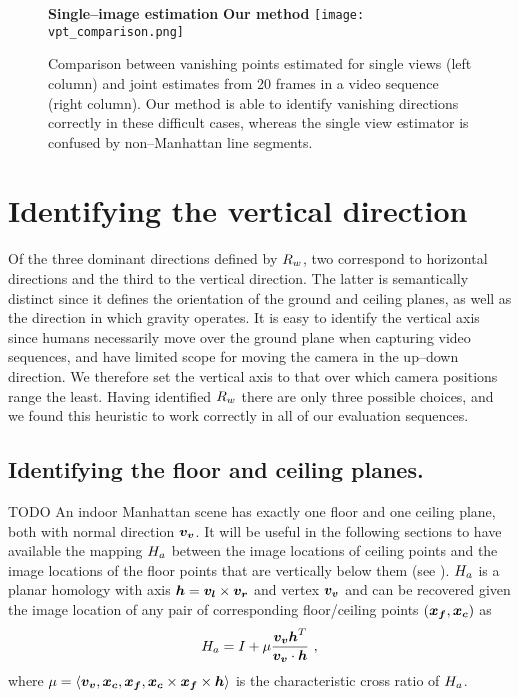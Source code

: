\begin{figure}[tb]
  \centering
      {\bf Single--image estimation}\cite{Zhang02} \hspace{2.25cm}
      {\bf Our method}
  \texttt{[image: vpt\_comparison.png]}
  \caption{Comparison between vanishing points estimated for single
    views (left column) and joint estimates from 20 frames in a video
    sequence (right column). Our method is able to identify vanishing
    directions correctly in these difficult cases, whereas the single
    view estimator is confused by non--Manhattan line segments.}
  \label{fig:vpt-comparison}
\end{figure}

\section{Identifying the vertical direction}
Of the three dominant directions defined by $\SceneR$, two correspond to
horizontal directions and the third to the vertical direction. The
latter is semantically distinct since it defines the orientation of
the ground and ceiling planes, as well as the direction in which
gravity operates. It is easy to identify the vertical axis since
humans necessarily move over the ground plane when capturing video
sequences, and have limited scope for moving the camera in the
up--down direction. We therefore set the vertical axis to that over
which camera positions range the least. Having identified $\SceneR$ there
are only three possible choices, and we found this heuristic to work
correctly in all of our evaluation sequences.


\subsection{Identifying the floor and ceiling planes.}
\label{sect:fcmap}
TODO
An indoor Manhattan scene has exactly one floor and one ceiling plane,
both with normal direction $\vvpt$. It will be useful in the following
sections to have available the mapping $\Hcf$ between the image
locations of ceiling points and the image locations of the floor
points that are vertically below them (see ). $\Hcf$ is
a planar homology with axis $\vect{h}=\lvpt\times\rvpt$ and vertex
$\vvpt$ \cite{Criminisi01} and can be recovered given the image
location of any pair of corresponding floor/ceiling points
$(\vect{x_f},\vect{x_c})$ as
\begin{equation}
  \Hcf = I + \mu\frac{\vvpt\vect{h}^T}{\vvpt \cdot \vect{h}} ~,
\end{equation}
where $\mu = \langle\vvpt,\vect{x_c},\vect{x_f},
\vect{x_c}\times\vect{x_f}\times\vect{h}\rangle$ is the characteristic cross
ratio of $\Hcf$.

